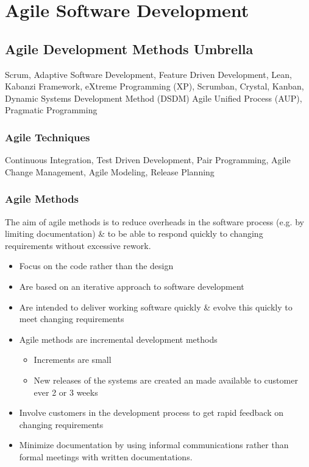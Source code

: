 \documentclass{report}
\begin{document}
\chapter{Agile Software Development} 
\section{Agile Development Methods Umbrella}
\noindent Scrum, Adaptive Software Development, Feature Driven Development, Lean, Kabanzi Framework, eXtreme Programming (XP), Scrumban, Crystal, Kanban, Dynamic Systems Development Method (DSDM) Agile Unified Process (AUP), Pragmatic Programming

\subsection{Agile Techniques}
\noindent Continuous Integration, Test Driven Development, Pair Programming, Agile Change Management, Agile Modeling, Release Planning

\subsection{Agile Methods}
\noindent The aim of agile methods is to reduce overheads in the software process (e.g. by limiting documentation) \& to be able to respond quickly to changing requirements without excessive rework.
\begin{itemize}
  \item Focus on the code rather than the design
  \item Are based on an iterative approach to software development
  \item Are intended to deliver working software quickly \& evolve this quickly to meet changing requirements
  \item Agile methods are incremental development methods
  \begin{itemize}
    \item Increments are small
    \item New releases of the systems are created an made available to customer ever 2 or 3 weeks
  \end{itemize}
  \item Involve customers in the development process to get rapid feedback on changing requirements
  \item Minimize documentation by using informal communications rather than formal meetings with written documentations.
\end{itemize}
\end{document}
